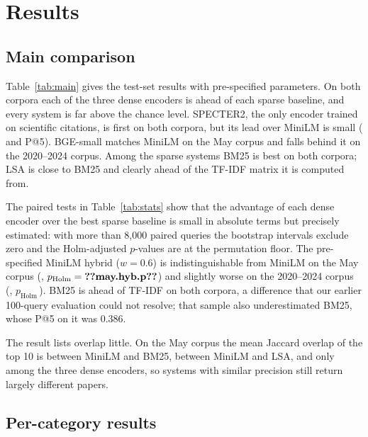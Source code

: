 \documentclass[conference]{IEEEtran}
\begin{document}
\section{Results}
\label{sec:results}

\subsection{Main comparison}

Table~\ref{tab:main} gives the test-set results with pre-specified parameters. On both corpora each of the three dense encoders is ahead of each sparse baseline, and every system is far above the chance level. SPECTER2, the only encoder trained on scientific citations, is first on both corpora, but its lead over MiniLM is small ( and  P@5). BGE-small matches MiniLM on the May corpus and falls behind it on the 2020--2024 corpus. Among the sparse systems BM25 is best on both corpora; LSA is close to BM25 and clearly ahead of the TF-IDF matrix it is computed from.



The paired tests in Table~\ref{tab:stats} show that the advantage of each dense encoder over the best sparse baseline is small in absolute terms but precisely estimated: with more than 8{,}000 paired queries the bootstrap intervals exclude zero and the Holm-adjusted $p$-values are at the permutation floor. The pre-specified MiniLM hybrid ($w=0.6$) is indistinguishable from MiniLM on the May corpus (, $p_{\mathrm{Holm}}=\val{may.hyb.p}$) and slightly worse on the 2020--2024 corpus (, $p_{\mathrm{Holm}}$\,). BM25 is ahead of TF-IDF on both corpora, a difference that our earlier 100-query evaluation could not resolve; that sample also underestimated BM25, whose P@5 on it was 0.386.



The result lists overlap little. On the May corpus the mean Jaccard overlap of the top 10 is  between MiniLM and BM25,  between MiniLM and LSA, and only  among the three dense encoders, so systems with similar precision still return largely different papers.

\subsection{Per-category results}
\end{document}
